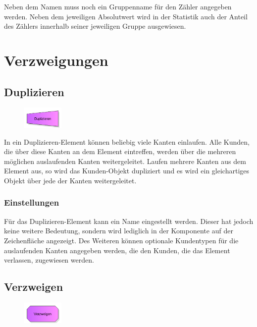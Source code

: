 Neben dem Namen muss noch ein Gruppenname für den Zähler angegeben werden. Neben dem jeweiligen
Absolutwert wird in der Statistik auch der Anteil des Zählers innerhalb seiner jeweiligen Gruppe ausgewiesen.





\chapter{Verzweigungen}

\section{Duplizieren}
\label{ref:ModelElementDuplicate}

\begin{figure}
\vspace{-22pt}
\includegraphics[width=2cm]{imageModelElementDuplicate.png}
\vspace{-22pt}
\end{figure}

In ein Duplizieren-Element können beliebig viele Kanten einlaufen. Alle Kunden, die über diese Kanten an dem Element eintreffen,
werden über die mehreren möglichen auslaufenden Kanten weitergeleitet. Laufen mehrere Kanten aus dem Element aus, so wird das
Kunden-Objekt dupliziert und es wird ein gleichartiges Objekt über jede der Kanten weitergeleitet.

\subsection*{Einstellungen}

Für das Duplizieren-Element kann ein Name eingestellt werden. Dieser hat jedoch keine weitere Bedeutung, sondern wird lediglich
in der Komponente auf der Zeichenfläche angezeigt. Des Weiteren können optionale Kundentypen für die auslaufenden Kanten angegeben
werden, die den Kunden, die das Element verlassen, zugewiesen werden.


\section{Verzweigen}
\label{ref:ModelElementDecide}

\begin{figure}
\vspace{-22pt}
\includegraphics[width=2cm]{imageModelElementDecide.png}
\vspace{-22pt}
\end{figure}

